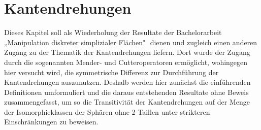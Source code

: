 \documentclass[12pt,titlepage,twoside,cleardoublepage]{article}
\theoremstyle{nummermitklammern}
\numberwithin{equation}{section}
\begin{document}
 \section{Kantendrehungen}\label{edget}
Dieses Kapitel soll als Wiederholung der Resultate der Bachelorarbeit „Manipulation diskreter simplizialer Flächen"
$ $ dienen und zugleich einen anderen Zugang zu der Thematik der Kantendrehungen liefern. Dort wurde der Zugang durch die sogenannten Mender- und Cutteroperatoren ermöglicht, wohingegen hier versucht wird, die symmetrische Differenz zur Durchführung der Kantendrehungen auszunutzen. Deshalb werden hier zunächst die einführenden Definitionen umformuliert und die daraus entstehenden Resultate ohne Beweis zusammengefasst, um so die Transitivität der Kantendrehungen auf der Menge der Isomorphieklassen der Sphären ohne 2-Taillen unter strikteren Einschränkungen zu beweisen. 
\end{document}
